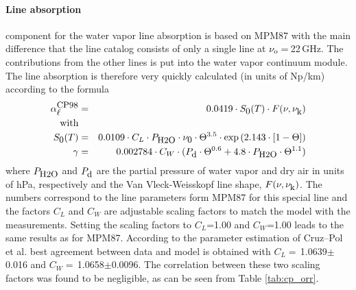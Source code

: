 \paragraph{Line absorption}
\label{levele:cp98_h2oline}
component \citep{cruzpol:98} for the water vapor line absorption 
is based on MPM87 with the main difference that the 
line catalog consists of only a single line at $\nu_{\rm o}=$\,22\,GHz. 
The contributions from the other lines is put into the water vapor 
continuum module. The line absorption is therefore very quickly 
calculated (in units of Np/km) according to the formula
\begin{eqnarray}
  \label{eq:abs_theory:cp98:lineabs}
  \alphacpl &=& 0.0419 \cdot \intencp \cdot \shape \\
  \mbox{with} & & \nonumber\\
  \label{eq:abs_theory:cp98:inten}
  \intencp    &=& 0.0109 \cdot C_L \cdot \phzo \cdot \nuo \cdot \Theta^{3.5} 
             \cdot \exp{(2.143\cdot[1-\Theta])}\nonumber\\
%
  \label{eq:abs_theory:cp98:width}
  \gamma &=& 0.002784 \cdot C_W \cdot (\pda \cdot \Theta^{0.6}+ 
             4.8 \cdot \phzo \cdot \Theta^{1.1}) \nonumber\\
\end{eqnarray}
where $P_{\mbox{\rm \small H2O}}$ and $P_{\mbox{\rm \small d}}$ are the partial pressure of water vapor and dry
air in units of hPa, respectively and the Van Vleck-Weisskopf line
shape, $F(\nu,\nu_{\mbox{\rm \small k}})$. The numbers correspond to the line
parameters form MPM87 for this special line and the factors  
$C_L$ and $C_W$ are adjustable scaling factors to match the model with the
measurements. Setting the scaling factors to $C_L$=1.00 and $C_W$=1.00 
leads to the same results as for MPM87. According to the parameter 
estimation of Cruz--Pol et al. best agreement between 
data and model is obtained with $C_L=$\,1.0639$\pm$0.016 and 
$C_W=$\,1.0658$\pm$0.0096. The correlation between these two scaling 
factors was found to be negligible, as can be seen from 
Table \ref{tab:cp_orr}.

